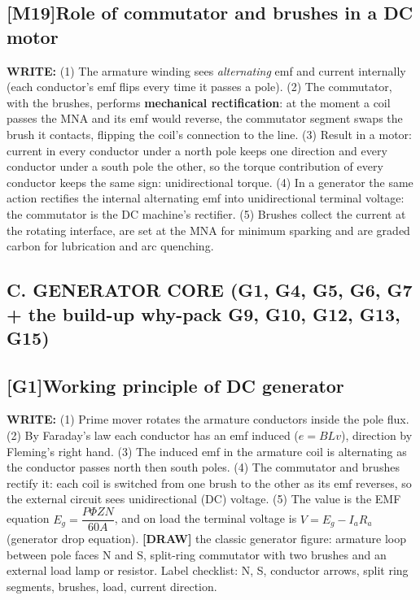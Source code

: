 \documentclass[11pt]{article}
\newcommand{\q}[2]{\subsection*{\color{copper}#1\quad\color{iron}#2}}
\newcommand{\w}[1]{\textbf{\color{copper}WRITE:} #1}
\newcommand{\dw}[1]{\textbf{\color{muted}[DRAW]} #1}
\begin{document}
\q{[M19]}{Role of commutator and brushes in a DC motor}
\w{(1) The armature winding sees \emph{alternating} emf and current internally (each conductor's emf flips every time it passes a pole). (2) The commutator, with the brushes, performs \textbf{mechanical rectification}: at the moment a coil passes the MNA and its emf would reverse, the commutator segment swaps the brush it contacts, flipping the coil's connection to the line. (3) Result in a motor: current in every conductor under a north pole keeps one direction and every conductor under a south pole the other, so the torque contribution of every conductor keeps the same sign: unidirectional torque. (4) In a generator the same action rectifies the internal alternating emf into unidirectional terminal voltage: the commutator is the DC machine's rectifier. (5) Brushes collect the current at the rotating interface, are set at the MNA for minimum sparking and are graded carbon for lubrication and arc quenching.}

\hrulefill
\subsection*{\color{copper}C. GENERATOR CORE (G1, G4, G5, G6, G7 + the build-up why-pack G9, G10, G12, G13, G15)}

\q{[G1]}{Working principle of DC generator}
\w{(1) Prime mover rotates the armature conductors inside the pole flux. (2) By Faraday's law each conductor has an emf induced ($e = B L v$), direction by Fleming's right hand. (3) The induced emf in the armature coil is alternating as the conductor passes north then south poles. (4) The commutator and brushes rectify it: each coil is switched from one brush to the other as its emf reverses, so the external circuit sees unidirectional (DC) voltage. (5) The value is the EMF equation $E_g = \dfrac{P \Phi Z N}{60 A}$, and on load the terminal voltage is $V = E_g - I_a R_a$ (generator drop equation).}
\dw{the classic generator figure: armature loop between pole faces N and S, split-ring commutator with two brushes and an external load lamp or resistor. Label checklist: N, S, conductor arrows, split ring segments, brushes, load, current direction.}
\end{document}
